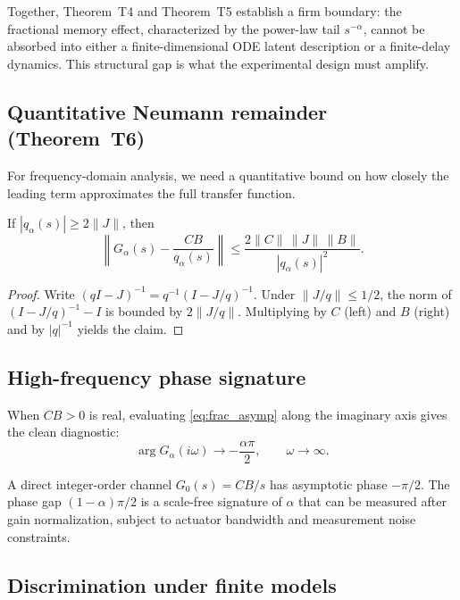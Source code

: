 Together, Theorem~T4 and Theorem~T5 establish a firm boundary: the fractional memory effect, characterized by the power-law tail \(s^{-\alpha}\), cannot be absorbed into either a finite-dimensional ODE latent description or a finite-delay dynamics. This structural gap is what the experimental design must amplify.

\subsection{Quantitative Neumann remainder (Theorem~T6)}

For frequency-domain analysis, we need a quantitative bound on how closely the leading term approximates the full transfer function.

\begin{theorem}
\label{thm:T6}
If \(|q_\alpha(s)| \ge 2\|J\|\), then
\[
\left\| G_\alpha(s) - \frac{CB}{q_\alpha(s)} \right\|
\le \frac{2\|C\|\,\|J\|\,\|B\|}{|q_\alpha(s)|^2}.
\]
\end{theorem}

\begin{proof}
Write \((qI - J)^{-1} = q^{-1}(I - J/q)^{-1}\). Under \(\|J/q\| \le 1/2\), the norm of \((I - J/q)^{-1} - I\) is bounded by \(2\|J/q\|\). Multiplying by \(C\) (left) and \(B\) (right) and by \(|q|^{-1}\) yields the claim.
\end{proof}

\subsection{High-frequency phase signature}

When \(CB > 0\) is real, evaluating \eqref{eq:frac_asymp} along the imaginary axis gives the clean diagnostic:
\begin{equation}
\boxed{\arg G_\alpha(i\omega) \to -\frac{\alpha\pi}{2},\qquad \omega \to \infty.}
\label{eq:phase}
\end{equation}

A direct integer-order channel \(G_0(s) = CB/s\) has asymptotic phase \(-\pi/2\). The phase gap \((1-\alpha)\pi/2\) is a scale-free signature of \(\alpha\) that can be measured after gain normalization, subject to actuator bandwidth and measurement noise constraints.

\subsection{Discrimination under finite models}

